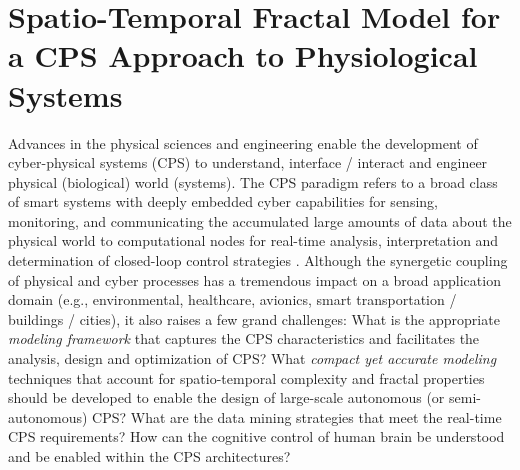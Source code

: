 \chapter{Spatio-Temporal Fractal Model for a CPS Approach to Physiological Systems}
\label{cha:ch3}
Advances in the physical sciences and engineering enable the development of cyber-physical systems (CPS) to understand, interface / interact and engineer physical (biological) world (systems). The CPS paradigm refers to a broad class of smart systems with deeply embedded cyber capabilities for sensing, monitoring, and communicating the accumulated large amounts of data about the physical world to computational nodes for real-time analysis, interpretation and determination of closed-loop control strategies \cite{Abdelzaher}\cite{Baheti}\cite{Bogdan}. Although the synergetic coupling of physical and cyber processes has a tremendous impact on a broad application domain (e.g., environmental, healthcare, avionics, smart transportation / buildings / cities), it also raises a few grand challenges: What is the appropriate \textit{modeling framework} that captures the CPS characteristics and facilitates the analysis, design and optimization of CPS? What \textit{compact yet accurate modeling} techniques that account for spatio-temporal complexity and fractal properties should be developed to enable the design of large-scale autonomous (or semi-autonomous) CPS? What are the data mining strategies that meet the real-time CPS requirements? How can the cognitive control of human brain be understood and be enabled within the CPS architectures?

